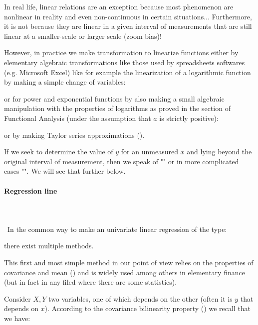 	In real life, linear relations are an exception because most phenomenon are nonlinear in reality and even non-continuous in certain situations... Furthermore, it is not because they are linear in a given interval of measurements that are still linear at a smaller-scale or larger scale (zoom bias)!
	
	However, in practice we make transformation to linearize functions either by elementary algebraic transformations like those used by spreadsheets softwares (e.g. Microsoft Excel) like for example the linearization of a logarithmic function by making a simple change of variables:
	
	or for power and exponential functions by also making a small algebraic manipulation with the properties of logarithms as proved in the section of Functional Analysis (under the assumption that $a$ is strictly positive)\label{logarithmic and exponential linearization}:
	
	or by making Taylor series approximations ().
	
	\begin{tcolorbox}[title=Remark,colframe=black,arc=10pt]
	If we seek to determine the value of $y$ for an unmeasured $x$ and lying beyond the original interval of measurement, then we speak of "" or in more complicated cases "". We will see that further below.
	\end{tcolorbox}	
	
	\paragraph{Regression line}\mbox{}\\\\\
	In the common way to make an univariate linear regression of the type:
	
	there exist multiple methods.
	
	This first and most simple method in our point of view relies on the properties of covariance and mean () and is widely used among others in elementary finance (but in fact in any filed where there are some statistics).
	
	Consider $X, Y$ two variables, one of which depends on the other (often it is $y$ that depends on $x$). According to the covariance bilinearity property () we recall that we have:
	
